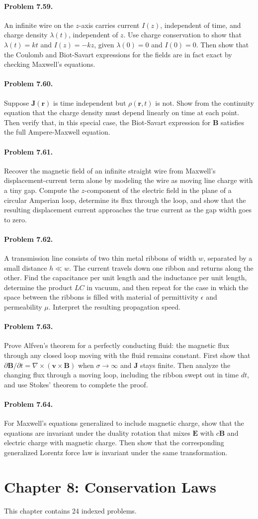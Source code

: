 \documentclass{aa}
\newcommand{\problemstatement}[2]{%
\paragraph{Problem #1.}#2\par\medskip
}
\begin{document}
\problemstatement{7.59}{An infinite wire on the \(z\)-axis carries current \(I(z)\), independent of time, and charge density \(\lambda(t)\), independent of \(z\). Use charge conservation to show that \(\lambda(t)=kt\) and \(I(z)=-kz\), given \(\lambda(0)=0\) and \(I(0)=0\). Then show that the Coulomb and Biot-Savart expressions for the fields are in fact exact by checking Maxwell's equations.}
\problemstatement{7.60}{Suppose \(\mathbf J(\mathbf r)\) is time independent but \(\rho(\mathbf r,t)\) is not. Show from the continuity equation that the charge density must depend linearly on time at each point. Then verify that, in this special case, the Biot-Savart expression for \(\mathbf B\) satisfies the full Ampere-Maxwell equation.}
\problemstatement{7.61}{Recover the magnetic field of an infinite straight wire from Maxwell's displacement-current term alone by modeling the wire as moving line charge with a tiny gap. Compute the \(z\)-component of the electric field in the plane of a circular Amperian loop, determine its flux through the loop, and show that the resulting displacement current approaches the true current as the gap width goes to zero.}
\problemstatement{7.62}{A transmission line consists of two thin metal ribbons of width \(w\), separated by a small distance \(h\ll w\). The current travels down one ribbon and returns along the other. Find the capacitance per unit length and the inductance per unit length, determine the product \(LC\) in vacuum, and then repeat for the case in which the space between the ribbons is filled with material of permittivity \(\epsilon\) and permeability \(\mu\). Interpret the resulting propagation speed.}
\problemstatement{7.63}{Prove Alfven's theorem for a perfectly conducting fluid: the magnetic flux through any closed loop moving with the fluid remains constant. First show that \(\partial \mathbf B/\partial t=\nabla\times(\mathbf v\times \mathbf B)\) when \(\sigma\to\infty\) and \(\mathbf J\) stays finite. Then analyze the changing flux through a moving loop, including the ribbon swept out in time \(dt\), and use Stokes' theorem to complete the proof.}
\problemstatement{7.64}{For Maxwell's equations generalized to include magnetic charge, show that the equations are invariant under the duality rotation that mixes \(\mathbf E\) with \(c\mathbf B\) and electric charge with magnetic charge. Then show that the corresponding generalized Lorentz force law is invariant under the same transformation.}

\section{Chapter 8: Conservation Laws}
This chapter contains 24 indexed problems.
\end{document}
